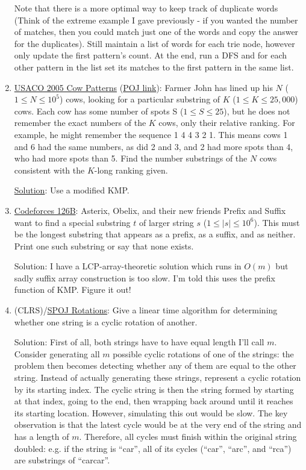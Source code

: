 \documentclass[11pt, oneside]{article}
\begin{document}
\begin{enumerate}
  Note that there is a more optimal way to keep track of duplicate words
  (Think of the extreme example I gave previously - if you wanted the number of matches,
  then you could match just one of the words and copy the answer for the duplicates).
  Still maintain a list of words for each trie node, however only update the first pattern's count.
  At the end, run a DFS and for each other pattern in the list set its matches to the first pattern in the same list.

  \item \href{https://contest.usaco.org/DEC05.htm}{USACO 2005 Cow Patterns} (\href{http://poj.org/problem?id=3167}{POJ link}): Farmer John has lined up his \( N \) (\( 1 \leq N \leq 10^5 \)) cows,
  looking for a particular substring of \( K \) (\( 1 \leq K \leq 25,000 \)) cows.
  Each cow has some number of spots S (\( 1 \leq S \leq 25 \)), but he does
  not remember the exact numbers of the \( K \) cows, only their relative ranking. For example, he might
  remember the sequence 1 4 4 3 2 1. This means cows 1 and 6 had the same numbers, as did 2 and 3,
  and 2 had more spots than 4, who had more spots than 5.
  Find the number substrings of the \( N \) cows consistent with the \( K \)-long ranking given.

  \href{https://contest.usaco.org/DEC05anal/cpattern.htm}{Solution}: Use a modified KMP.

  \item \href{https://codeforces.com/problemset/problem/126/B}{Codeforces 126B}: Asterix, Obelix, and their new friends Prefix and Suffix
  want to find a special substring \( t \) of larger string \( s \) (\(1 \leq |s| \leq 10^6 \)).
  This must be the longest substring that appears as a prefix, as a suffix, and as neither.
  Print one such substring or say that none exists.

  Solution: I have a LCP-array-theoretic solution which runs in \( O(m) \) but sadly suffix array construction is too slow. I'm told this uses the prefix function of KMP. Figure it out!

  \item (CLRS)/\href{https://www.spoj.com/problems/EC_WORLD}{SPOJ Rotations}: Give a linear time algorithm for determining whether one string is a cyclic rotation of another.

  Solution: First of all, both strings have to have equal length I'll call \( m \).
  Consider generating all \( m \) possible cyclic rotations of one of the strings: the problem
  then becomes detecting whether any of them are equal to the other string. Instead of
  actually generating these strings, represent a cyclic rotation by its starting index.
  The cyclic string is then the string formed by starting at that index, going to the end,
  then wrapping back around until it reaches its starting location. However, simulating
  this out would be slow. The key observation is that the latest cycle would be at the very end of the string
  and has a length of \( m \). Therefore, all cycles must finish within the original string doubled:
  e.g. if the string is ``car'', all of its cycles (``car'', ``arc'', and ``rca'') are substrings of ``carcar''.


\end{enumerate}
\end{document}
